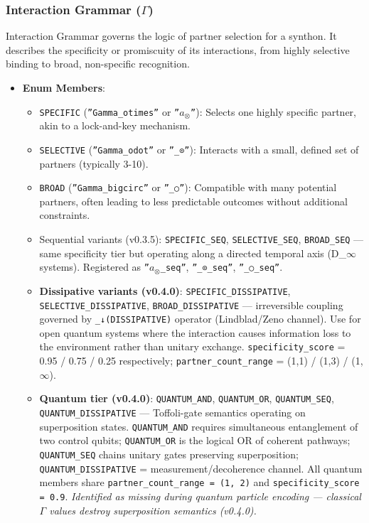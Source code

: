 \documentclass[12pt,a4paper]{article}
\begin{document}
\subsubsection{Interaction Grammar ($\Gamma$)}

Interaction Grammar governs the logic of partner selection for a synthon. It describes the specificity or promiscuity of its interactions, from highly selective binding to broad, non-specific recognition.

\begin{itemize}
    \item 
    \textbf{Enum Members}:

    \begin{itemize}
    \item \texttt{SPECIFIC} (\texttt{''Gamma\_otimes''} or \texttt{''\Gamm$a_{\otimes}$''}): Selects one highly specific partner, akin to a lock-and-key mechanism.
    \item \texttt{SELECTIVE} (\texttt{''Gamma\_odot''} or \texttt{''\Gamma\_⊙''}): Interacts with a small, defined set of partners (typically 3-10).
    \item \texttt{BROAD} (\texttt{''Gamma\_bigcirc''} or \texttt{''\Gamma\_○''}): Compatible with many potential partners, often leading to less predictable outcomes without additional constraints.
    \item Sequential variants (v0.3.5): \texttt{SPECIFIC\_SEQ}, \texttt{SELECTIVE\_SEQ}, \texttt{BROAD\_SEQ} --- same specificity tier but operating along a directed temporal axis (D\_$\infty$ systems). Registered as \texttt{''\Gamm$a_{\otimes}$\_seq''}, \texttt{''\Gamma\_⊙\_seq''}, \texttt{''\Gamma\_○\_seq''}.
    \item \textbf{Dissipative variants (v0.4.0)}: \texttt{SPECIFIC\_DISSIPATIVE}, \texttt{SELECTIVE\_DISSIPATIVE}, \texttt{BROAD\_DISSIPATIVE} --- irreversible coupling governed by \texttt{\Gamma\_↓(DISSIPATIVE)} operator (Lindblad/Zeno channel). Use for open quantum systems where the interaction causes information loss to the environment rather than unitary exchange. \texttt{specificity\_score} = 0.95 / 0.75 / 0.25 respectively; \texttt{partner\_count\_range} = (1,1) / (1,3) / (1,$\infty$).
    \item \textbf{Quantum tier (v0.4.0)}: \texttt{QUANTUM\_AND}, \texttt{QUANTUM\_OR}, \texttt{QUANTUM\_SEQ}, \texttt{QUANTUM\_DISSIPATIVE} --- Toffoli-gate semantics operating on superposition states. \texttt{QUANTUM\_AND} requires simultaneous entanglement of two control qubits; \texttt{QUANTUM\_OR} is the logical OR of coherent pathways; \texttt{QUANTUM\_SEQ} chains unitary gates preserving superposition; \texttt{QUANTUM\_DISSIPATIVE} = measurement/decoherence channel. All quantum members share \texttt{partner\_count\_range = (1, 2)} and \texttt{specificity\_score = 0.9}. \emph{Identified as missing during quantum particle encoding --- classical $\Gamma$ values destroy superposition semantics (v0.4.0).}
\end{itemize}


\end{itemize}
\end{document}
